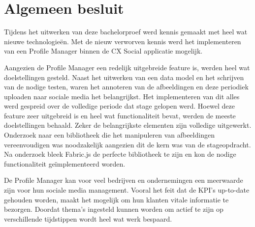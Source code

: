 \chapter{Algemeen besluit}
\vspace{-3cm}

Tijdens het uitwerken van deze bachelorproef werd kennis gemaakt met heel wat nieuwe technologie\"{e}n. Met de nieuw verworven kennis werd het implementeren van een Profile Manager binnen de CX Social applicatie mogelijk. %

Aangezien de Profile Manager een redelijk uitgebreide feature is, werden heel wat doelstellingen gesteld. Naast het uitwerken van een data model en het schrijven van de nodige testen, waren het annoteren van de afbeeldingen en deze periodiek uploaden naar sociale media het belangrijkst. Het implementeren van dit alles werd gespreid over de volledige periode dat stage gelopen werd. Hoewel deze feature zeer uitgebreid is en heel wat functionaliteit bevat, werden de meeste doelstellingen behaald. Zeker de belangrijkste elementen zijn volledige uitgewerkt. Onderzoek naar een bibliotheek die het manipuleren van afbeeldingen vereenvoudigen was noodzakelijk aangezien dit de kern was van de stageopdracht. Na onderzoek bleek Fabric.js de perfecte bibliotheek te zijn en kon de nodige functionaliteit ge\"{i}mplementeerd worden.

De Profile Manager kan voor veel bedrijven en ondernemingen een meerwaarde zijn voor hun sociale media management. Vooral het feit dat de KPI's up-to-date gehouden worden, maakt het mogelijk om hun klanten vitale informatie te bezorgen. Doordat thema's ingesteld kunnen worden om actief te zijn op verschillende tijdstippen wordt heel wat werk bespaard. 

